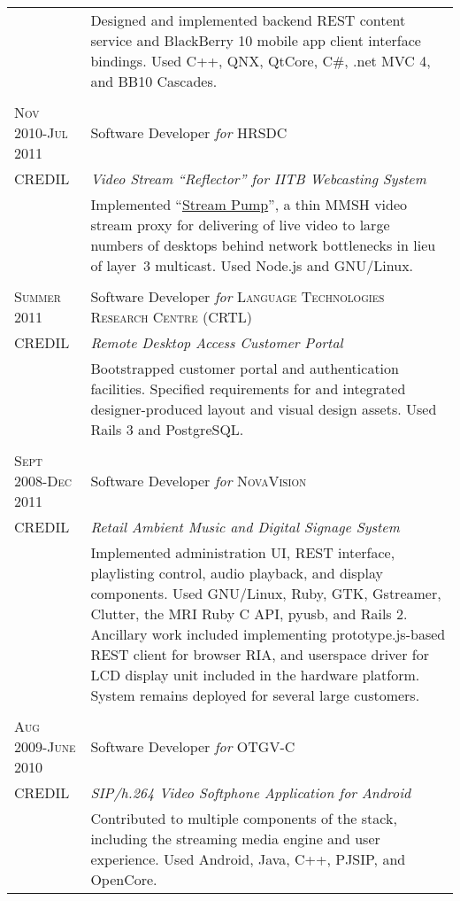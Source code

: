 \documentclass[letterpaper,10pt]{article}
\begin{document}
\begin{longtable}{p{3cm}|p{12cm}}
   & \footnotesize{Designed and implemented backend REST content service and BlackBerry 10 mobile app client interface bindings.  Used C++, QNX, QtCore, C\#, .net MVC 4, and BB10 Cascades.} \\
\multicolumn{2}{c}{} \\
  \textsc{Nov 2010-Jul 2011} & Software Developer \emph{for} \textsc{HRSDC} \\
  \tiny{CREDIL} & \emph{Video Stream ``Reflector'' for IITB Webcasting System} \\
   & \footnotesize{Implemented ``{\href{https://github.com/orospakr/stream-pump}{Stream Pump}}'', a thin MMSH video stream proxy for delivering of live video to large numbers of desktops behind network bottlenecks in lieu of \mbox{layer 3} \mbox{multicast}.  Used Node.js and GNU/Linux.} \\
\multicolumn{2}{c}{} \\
  \textsc{Summer 2011} & Software Developer \emph{for} \textsc{Language Technologies Research Centre (CRTL)} \\
  \tiny{CREDIL} & \emph{Remote Desktop Access Customer Portal} \\
   & \footnotesize{Bootstrapped customer portal and authentication facilities.  Specified requirements for and integrated designer-produced layout and visual design assets.  Used Rails 3 and PostgreSQL.} \\
  \multicolumn{2}{c}{} \\
  \textsc{Sept 2008-Dec 2011} & Software Developer \emph{for} \textsc{NovaVision} \\
  \tiny{CREDIL} & \emph{Retail Ambient Music and Digital Signage System} \\
   & \footnotesize{Implemented administration UI, REST interface, playlisting control, audio playback, and display components.  Used GNU/Linux, Ruby, GTK, Gstreamer, Clutter, the MRI Ruby C API, pyusb, and Rails 2.  Ancillary work included implementing prototype.js-based REST client for browser RIA, and userspace driver for LCD display unit included in the hardware platform. System remains deployed for several large customers.} \\
  \multicolumn{2}{c}{} \\
  \textsc{Aug 2009-June 2010} & Software Developer \emph{for} OTGV-C \\
  \tiny{CREDIL} & \emph{SIP/h.264 Video Softphone Application for Android} \\
  & \footnotesize{Contributed to multiple components of the stack, including the streaming media engine and user experience.  Used Android, Java, C++, PJSIP, and OpenCore.} \\

\end{longtable}
\end{document}

